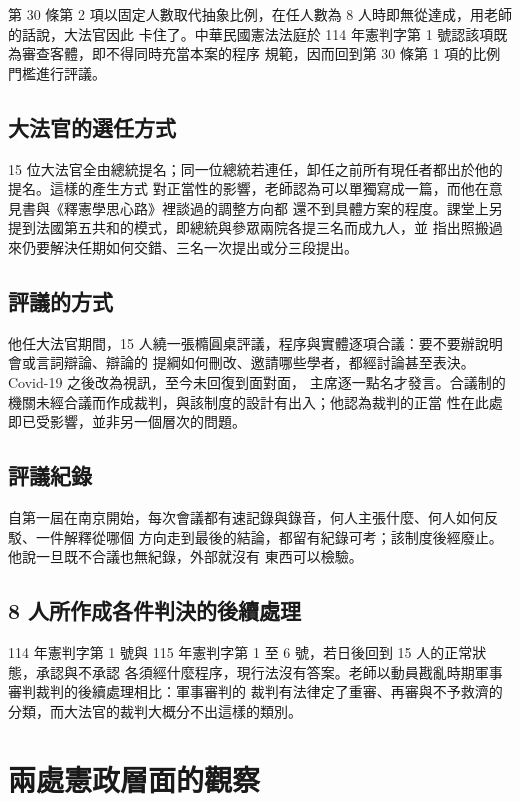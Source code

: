 第 30 條第 2 項以固定人數取代抽象比例，在任人數為 8 人時即無從達成，用老師的話說，大法官因此
卡住了。中華民國憲法法庭於 114 年憲判字第 1 號認該項既為審查客體，即不得同時充當本案的程序
規範，因而回到第 30 條第 1 項的比例門檻進行評議。

\subsection{大法官的選任方式}

15 位大法官全由總統提名；同一位總統若連任，卸任之前所有現任者都出於他的提名。這樣的產生方式
對正當性的影響，老師認為可以單獨寫成一篇，而他在意見書與《釋憲學思心路》裡談過的調整方向都
還不到具體方案的程度。課堂上另提到法國第五共和的模式，即總統與參眾兩院各提三名而成九人，並
指出照搬過來仍要解決任期如何交錯、三名一次提出或分三段提出。

\subsection{評議的方式}

他任大法官期間，15 人繞一張橢圓桌評議，程序與實體逐項合議：要不要辦說明會或言詞辯論、辯論的
提綱如何刪改、邀請哪些學者，都經討論甚至表決。Covid-19 之後改為視訊，至今未回復到面對面，
主席逐一點名才發言。合議制的機關未經合議而作成裁判，與該制度的設計有出入；他認為裁判的正當
性在此處即已受影響，並非另一個層次的問題。

\subsection{評議紀錄}

自第一屆在南京開始，每次會議都有速記錄與錄音，何人主張什麼、何人如何反駁、一件解釋從哪個
方向走到最後的結論，都留有紀錄可考；該制度後經廢止。他說一旦既不合議也無紀錄，外部就沒有
東西可以檢驗。

\subsection{8 人所作成各件判決的後續處理}

114 年憲判字第 1 號與 115 年憲判字第 1 至 6 號，若日後回到 15 人的正常狀態，承認與不承認
各須經什麼程序，現行法沒有答案。老師以動員戡亂時期軍事審判裁判的後續處理相比：軍事審判的
裁判有法律定了重審、再審與不予救濟的分類，而大法官的裁判大概分不出這樣的類別。

\section{兩處憲政層面的觀察}

